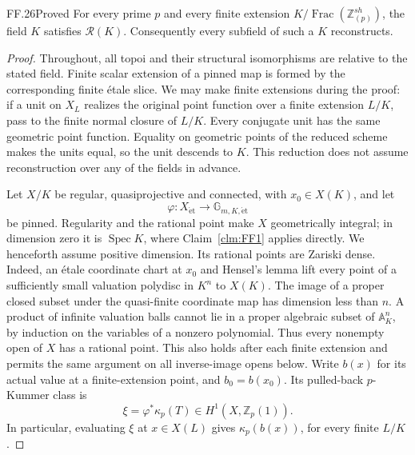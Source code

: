 \begin{claim}{FF.26}{Proved}\label{clm:FFstrictreconstruct}
For every prime \(p\) and every finite extension
\(K/\operatorname{Frac}(\mathbb Z_{(p)}^{sh})\),
the field \(K\) satisfies \(\mathcal R(K)\).
Consequently every subfield of such a \(K\) reconstructs.
\end{claim}

\begin{proof}
Throughout, all topoi and their structural isomorphisms are
relative to the stated field. Finite scalar extension of a
pinned map is formed by the corresponding finite \'etale
slice. We may make finite extensions during the proof:
if a unit on \(X_L\) realizes the original point function
over a finite extension \(L/K\), pass to the finite normal
closure of \(L/K\). Every conjugate unit has the same
geometric point function. Equality on geometric points of
the reduced scheme makes the units equal, so the unit
descends to \(K\). This reduction does not assume
reconstruction over any of the fields in advance.

Let \(X/K\) be regular, quasiprojective and connected, with
\(x_0\in X(K)\), and let
\[
 \varphi:X_{\mathrm{\acute et}}\longrightarrow
                    \mathbb G_{m,K,\mathrm{\acute et}}
\]
be pinned. Regularity and the rational point make \(X\)
geometrically integral; in dimension zero it is \(\operatorname{Spec}K\),
where Claim~\ref{clm:FF1} applies directly. We henceforth
assume positive dimension. Its rational points are Zariski
 dense. Indeed, an \'etale coordinate chart at \(x_0\)
and Hensel's lemma lift every point of a sufficiently
small valuation polydisc in \(K^n\) to \(X(K)\).
The image of a proper closed subset under the quasi-finite
coordinate map has dimension less than \(n\). A product
of infinite valuation balls cannot lie in a proper
algebraic subset of \(\mathbb A^n_K\), by induction
on the variables of a nonzero polynomial. Thus every
nonempty open of \(X\) has a rational point. This
also holds after each finite extension and permits the
same argument on all inverse-image opens below. Write \(b(x)\) for its actual
value at a finite-extension point, and \(b_0=b(x_0)\).
Its pulled-back \(p\)-Kummer class is
\[
                   \xi=\varphi^*\kappa_p(T)
                          \in H^1(X,\mathbb Z_p(1)).
\]
In particular, evaluating \(\xi\) at \(x\in X(L)\)
gives \(\kappa_p(b(x))\), for every finite \(L/K\).


\end{proof}
